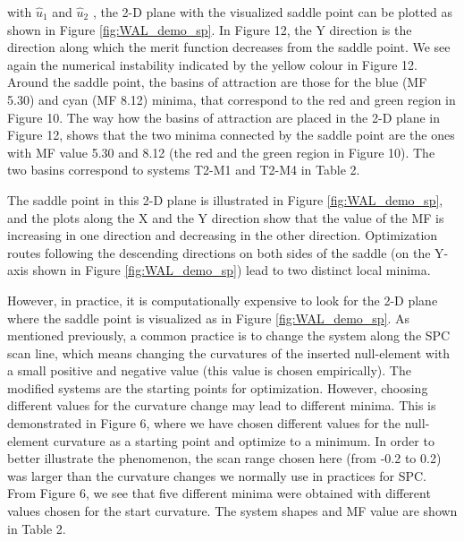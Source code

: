 with $\hat{u}_{1}$ and $\hat{u}_{2}$ , the 2-D plane with the visualized saddle point can be plotted as shown in Figure \ref{fig:WAL_demo_sp}.
In Figure 12, the Y direction is the direction along which the merit function decreases from the saddle point. We see again the numerical instability indicated by the yellow colour in Figure 12. Around the saddle point, the basins of attraction are those for the blue (MF 5.30) and cyan (MF 8.12) minima, that correspond to the red and green region in Figure 10. The way how the basins of attraction are placed in the 2-D plane in Figure 12, shows that the two minima connected by the saddle point are the ones with MF value 5.30 and 8.12 (the red and the green region in Figure 10). The two basins correspond to systems T2-M1 and T2-M4 in Table 2.




The saddle point in this 2-D plane is illustrated in Figure \ref{fig:WAL_demo_sp}, and the plots along the X and the Y direction show that the value of the MF is increasing in one direction and decreasing in the other direction. Optimization routes following the descending directions on both sides of the saddle (on the Y-axis shown in Figure \ref{fig:WAL_demo_sp}) lead to two distinct local minima.

However, in practice, it is computationally expensive to look for the 2-D plane where the saddle point is visualized as in Figure \ref{fig:WAL_demo_sp}. As mentioned previously, a common practice is to change the system along the SPC scan line, which means changing the curvatures of the inserted null-element with a small positive and negative value (this value is chosen empirically). The modified systems are the starting points for optimization. However, choosing different values for the curvature change may lead to different minima. This is demonstrated in Figure 6, where we have chosen different values for the null-element curvature as a starting point and optimize to a minimum. In order to better illustrate the phenomenon, the scan range chosen here (from -0.2 to 0.2) was larger than the curvature changes we normally use in practices for SPC. From Figure 6, we see that five different minima were obtained with different values chosen for the start curvature. The system shapes and MF value are shown in Table 2. 


